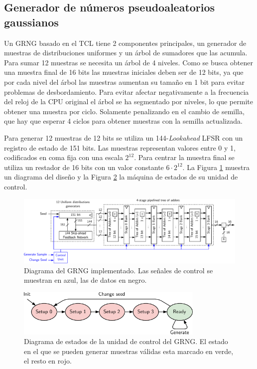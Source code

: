 \subsection{Generador de números pseudoaleatorios gaussianos}

Un GRNG basado en el TCL tiene 2 componentes principales, un generador de muestras de distribuciones uniformes y un árbol de sumadores que las acumula. Para sumar 12 muestras se necesita un árbol de 4 niveles. Como se busca obtener una muestra final de 16 bits las muestras iniciales deben ser de 12 bits, ya que por cada nivel del árbol las muestras aumentan su tamaño en 1 bit para evitar problemas de desbordamiento. Para evitar afectar negativamente a la frecuencia del reloj de la CPU original el árbol se ha segmentado por niveles, lo que permite obtener una muestra por ciclo. Solamente penalizando en el cambio de semilla, que hay que esperar 4 ciclos para obtener muestras con la semilla actualizada.

Para generar 12 muestras de 12 bits se utiliza un 144-\textit{Lookahead} LFSR con un registro de estado de 151 bits. Las muestras representan valores entre 0 y 1, codificados en coma fija con una escala $2^{12}$. Para centrar la muestra final se utiliza un restador de 16 bits con un valor constante $6 \cdot 2^{12}$. La Figura \ref{fig:grng} muestra un diagrama del diseño y la Figura \ref{fig:grng_state} la máquina de estados de su unidad de control.

\begin{figure}[h]
    \centering
    \includegraphics[width=\textwidth]{root/Imagenes/riscv_ext/grng.pdf}
    \caption{Diagrama del GRNG implementado. Las señales de control se muestran en azul, las de datos en negro.}
    \label{fig:grng}
\end{figure}

\begin{figure}[h]
    \centering
    \includegraphics[width=0.8\textwidth]{root/Imagenes/riscv_ext/grng_states.pdf}
    \caption{Diagrama de estados de la unidad de control del GRNG. El estado en el que se pueden generar muestras válidas esta marcado en verde, el resto en rojo.}
    \label{fig:grng_state}
\end{figure}

